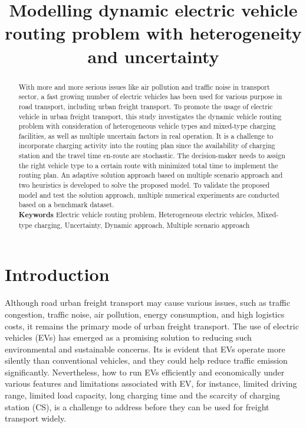 \documentclass[11pt]{article}
\title{Modelling dynamic electric vehicle routing problem with heterogeneity and uncertainty}
\author{ }
\date{}
\begin{document}

\maketitle

\begin{abstract}
With more and more serious issues like air pollution and traffic noise in transport sector, a fast growing number of electric vehicles has been used for various purpose in road transport, including urban freight transport. To promote the usage of electric vehicle in urban freight transport, this study investigates the dynamic vehicle routing problem with consideration of heterogeneous vehicle types and mixed-type charging facilities, as well as multiple uncertain factors in real operation. It is a challenge to incorporate charging activity into the routing plan since the availability of charging station and the travel time en-route are stochastic. The decision-maker needs to assign the right vehicle type to a certain route with minimized total time to implement the routing plan. An adaptive solution approach based on multiple scenario approach and two heuristics is developed to solve the proposed model. To validate the proposed model and test the solution approach, multiple numerical experiments are conducted based on a benchmark dataset. \\

\textbf{Keywords} Electric vehicle routing problem, Heterogeneous electric vehicles, Mixed-type charging, Uncertainty, Dynamic approach, Multiple scenario approach

\end{abstract}


\section{Introduction}

Although road urban freight transport may cause various issues, such as traffic congestion, traffic noise, air pollution, energy consumption, and high logistics costs, it remains the primary mode of urban freight transport. The use of electric vehicles (EVs) has emerged as a promising solution to reducing such environmental and sustainable concerns. Its is evident that EVs operate more silently than conventional vehicles, and they could help reduce traffic emission significantly.  Nevertheless, how to run EVs efficiently and economically under various features and limitations associated with EV, for instance, limited driving range, limited load capacity, long charging time and the scarcity of charging station (CS), is a challenge to address before they can be used for freight transport widely.
\end{document}
